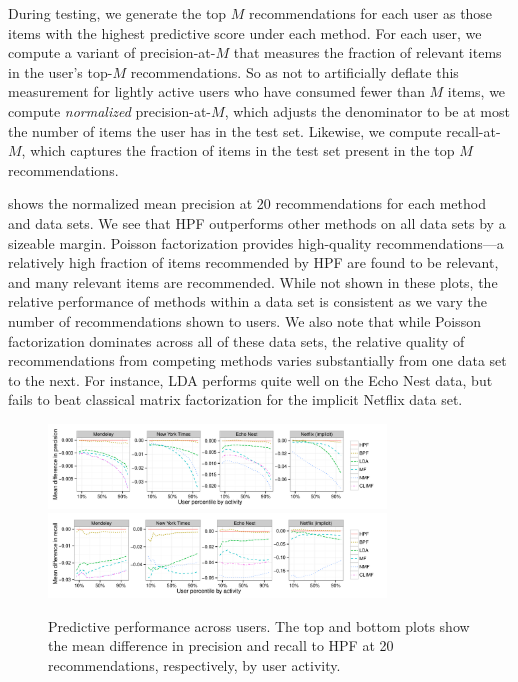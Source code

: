 During testing, we generate the top $M$ recommendations for each user
as those items with the highest predictive score under each
method. For each user, we compute a variant of precision-at-$M$ that
measures the fraction of relevant items in the user's top-$M$
recommendations. So as not to artificially deflate this measurement
for lightly active users who have consumed fewer than $M$ items, we
compute {\it normalized} precision-at-$M$, which adjusts the
denominator to be at most the number of items the user has in the
test set. Likewise, we compute recall-at-$M$, which captures the
fraction of items in the test set present in the top $M$
recommendations.


 shows the normalized mean precision at 20
recommendations for each method and data sets. We see that HPF
outperforms other methods on all data sets by a sizeable
margin. Poisson factorization provides high-quality
recommendations---a relatively high fraction of items recommended by
HPF are found to be relevant, and many relevant items are
recommended. While not shown in these plots, the relative performance
of methods within a data set is consistent as we vary the number of
recommendations shown to users. We also note that while Poisson
factorization dominates across all of these data sets, the relative
quality of recommendations from competing methods varies substantially
from one data set to the next. For instance, LDA performs quite well
on the Echo Nest data, but fails to beat classical matrix
factorization for the implicit Netflix data set.

\begin{figure}[t!]
\centering
\includegraphics[width=0.8\textwidth]{newfigs/mean_diff_precision_at_20_by_user_percentile.pdf}\\
\includegraphics[width=0.8\textwidth]{newfigs/mean_diff_recall_at_20_by_user_percentile.pdf}\\
\caption{Predictive performance across users. The top and bottom plots show the
  mean difference in precision and recall to HPF at 20 recommendations,
  respectively, by user activity.}
\label{fig:precision_recall_by_user_activity}
\end{figure}


